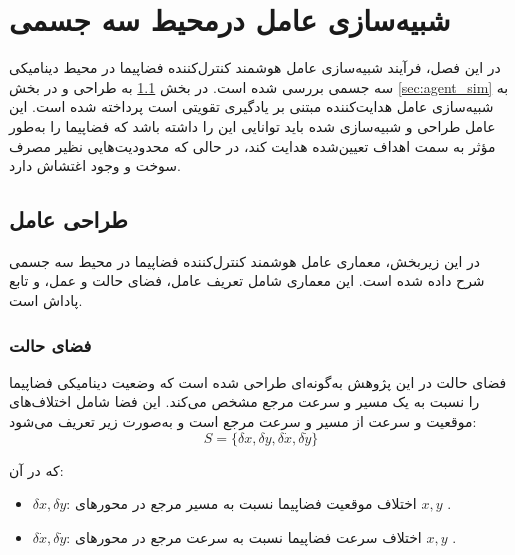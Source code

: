 \chapter{شبیه‌سازی عامل درمحیط سه جسمی}

%
	

	
		در این فصل، فرآیند شبیه‌سازی عامل هوشمند کنترل‌کننده فضاپیما در محیط دینامیکی سه جسمی بررسی شده است.
		در بخش \ref{sec:agent_design}
		به
		طراحی و 
		در بخش 
		\ref{sec:agent_sim}
	به	شبیه‌سازی عامل هدایت‌کننده مبتنی بر یادگیری تقویتی است
		پرداخته شده است. این عامل طراحی و شبیه‌سازی شده باید توانایی این را داشته باشد 
		 که  فضاپیما را به‌طور مؤثر به سمت اهداف تعیین‌شده هدایت کند، در حالی که محدودیت‌هایی نظیر مصرف سوخت و وجود اغتشاش دارد.
	
	
	\section{طراحی عامل}\label{sec:agent_design}
	
	در این زیربخش، معماری عامل هوشمند کنترل‌کننده فضاپیما در محیط سه جسمی شرح داده شده است. این معماری شامل تعریف عامل، فضای حالت و عمل، و تابع پاداش است.

	
	\subsection{ فضای حالت}

فضای حالت
در این پژوهش به‌گونه‌ای طراحی شده است که وضعیت دینامیکی فضاپیما را نسبت به یک مسیر و سرعت مرجع مشخص می‌کند. این فضا شامل اختلاف‌های موقعیت و سرعت از مسیر و سرعت مرجع  است و به‌صورت زیر تعریف می‌شود:
\[
S = \{ \delta x, \delta y, \delta \dot{x}, \delta \dot{y} \}
\]

که در آن:
\begin{itemize}
    \item \( \delta x, \delta y \): اختلاف موقعیت فضاپیما نسبت به مسیر مرجع در محورهای \( x, y \) .
    \item \( \delta \dot{x}, \delta \dot{y} \): اختلاف سرعت فضاپیما نسبت به سرعت مرجع در محورهای \( x, y \) .
\end{itemize}

